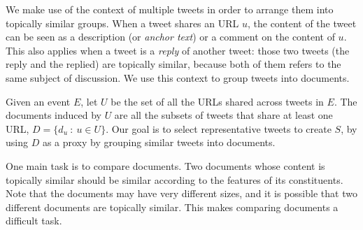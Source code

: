 \documentclass[12pt]{article}
\begin{document}
We make use of the context of multiple tweets in order to arrange them
into topically similar groups. When a tweet shares an URL $u$, the
content of the tweet can be seen as a description (or {\em anchor
text}) or a comment on the content of $u$. This also applies when a
tweet is a {\em reply} of another tweet: those two tweets (the reply
and the replied) are topically similar, because both of them refers to
the same subject of discussion. We use this context to group tweets
into documents.

Given an event $E$, let $U$ be the set of all the URLs shared across
tweets in $E$. The documents induced by $U$ are all the subsets of
tweets that share at least one URL, $D = \{d_u\ :\ u \in U\}$. Our
goal is to select representative tweets to create $S$, by using $D$ as
a proxy by grouping similar tweets into documents.

One main task is to compare documents. Two documents whose content is
topically similar should be similar according to the features of its
constituents. Note that the documents may have very different sizes,
and it is possible that two different documents are topically
similar. This makes comparing documents a difficult task.





\end{document}
